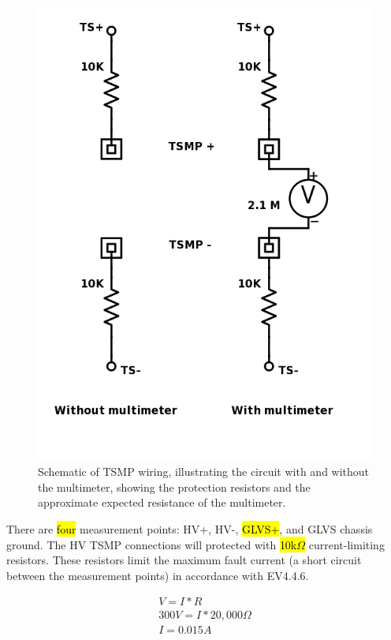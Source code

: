 \documentclass{article}
\begin{document}
\begin{figure}[H]
\centering
\includegraphics[scale=0.5]{TSMP-Schematic.png}
\caption{Schematic of TSMP wiring, illustrating the circuit with and without the multimeter, showing the protection resistors and the approximate expected resistance of the multimeter.}
\label{fig:TSMP_schematic}
\end{figure}

There are \hl{four} measurement points: HV+, HV-, \hl{GLVS+}, and GLVS chassis ground. The HV TSMP connections will protected with \hl{10k$\Omega$} current-limiting resistors. These resistors limit the maximum fault current (a short circuit between the measurement points) in accordance with EV4.4.6. 

\begin{align*}
V = I * R \\
300V = I * 20,000\Omega \\
I = 0.015A
\end{align*}
\end{document}
